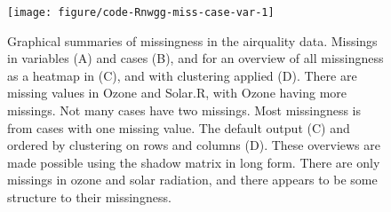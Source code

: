 \documentclass{article}\usepackage[]{graphicx}\usepackage[]{xcolor}
\makeatletter
\newenvironment{kframe}{%
 \def\at@end@of@kframe{}%
 \ifinner\ifhmode%
  \def\at@end@of@kframe{\end{minipage}}%
  \begin{minipage}{\columnwidth}%
 \fi\fi%
 \def\FrameCommand##1{\hskip\@totalleftmargin \hskip-\fboxsep
 \colorbox{shadecolor}{##1}\hskip-\fboxsep
     \hskip-\linewidth \hskip-\@totalleftmargin \hskip\columnwidth}%
 \MakeFramed {\advance\hsize-\width
   \@totalleftmargin\z@ \linewidth\hsize
   \@setminipage}}%
 {\par\unskip\endMakeFramed%
 \at@end@of@kframe}
\newenvironment{knitrout}{}{} %
\makeatother
\begin{document}
\begin{knitrout}
\color{fgcolor}\begin{kframe}


{\ttfamily\noindent\color{warningcolor}{\#\# Warning: `gather\_()` was deprecated in tidyr 1.2.0.\\\#\# i Please use `gather()` instead.\\\#\# i The deprecated feature was likely used in the visdat package.\\\#\# \ \ Please report the issue at <]8;;https://github.com/ropensci/visdat/issueshttps://github.com/ropensci/visdat/issues]8;;>.}}

{\ttfamily\noindent\color{warningcolor}{\#\# Warning: The `guide` argument in `scale\_*()` cannot be `FALSE`. This was deprecated in ggplot2\\\#\# 3.3.4.\\\#\# i Please use "{}none"{} instead.\\\#\# i The deprecated feature was likely used in the naniar package.\\\#\# \ \ Please report the issue at <]8;;https://github.com/njtierney/naniar/issueshttps://github.com/njtierney/naniar/issues]8;;>.}}\end{kframe}\begin{figure}

{\centering \texttt{[image: figure/code-Rnwgg-miss-case-var-1]} 

}

\caption[Graphical summaries of missingness in the airquality data]{Graphical summaries of missingness in the airquality data. Missings in variables (A) and cases (B), and for an overview of all missingness as a heatmap in (C), and with clustering applied (D). There are missing values in Ozone and Solar.R, with Ozone having more missings. Not many cases have two missings. Most missingness is from cases with one missing value. The default output (C) and ordered by clustering on rows and columns (D). These overviews are made possible using the shadow matrix in long form. There are only missings in ozone and solar radiation, and there appears to be some structure to their missingness.}\label{fig:gg-miss-case-var}
\end{figure}

\end{knitrout}
\end{document}
